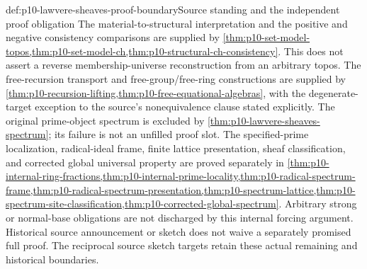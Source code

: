 \begin{proofboundary}{def:p10-lawvere-sheaves-proof-boundary}{Source standing and the independent proof obligation}
The material-to-structural interpretation and the positive and negative
consistency comparisons are supplied by
\cref{thm:p10-set-model-topos,thm:p10-set-model-ch,thm:p10-structural-ch-consistency}.
This does not assert a reverse membership-universe reconstruction from
an arbitrary topos. The free-recursion transport and
free-group/free-ring constructions are supplied by
\cref{thm:p10-recursion-lifting,thm:p10-free-equational-algebras},
with the degenerate-target exception to the source's nonequivalence
clause stated explicitly. The original prime-object spectrum is excluded
by \cref{thm:p10-lawvere-sheaves-spectrum}; its failure is not an unfilled
proof slot. The specified-prime localization, radical-ideal frame,
finite lattice presentation, sheaf classification, and corrected global
universal property are proved separately in
\cref{thm:p10-internal-ring-fractions,thm:p10-internal-prime-locality,thm:p10-radical-spectrum-frame,thm:p10-radical-spectrum-presentation,thm:p10-spectrum-lattice,thm:p10-spectrum-site-classification,thm:p10-corrected-global-spectrum}. Arbitrary
strong or normal-base obligations are not discharged by this internal
forcing argument. Historical source announcement or sketch does not
waive a separately promised full proof. The reciprocal source sketch
targets retain these actual remaining and historical boundaries.
\end{proofboundary}
